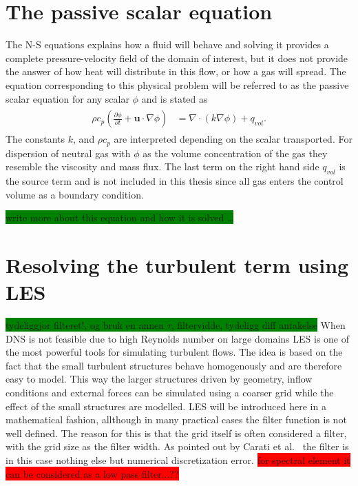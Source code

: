 
\section{The passive scalar equation}
The N-S equations explains how a fluid will behave and solving it provides a complete pressure-velocity field of the 
domain of interest, but it does not provide the answer of how heat will distribute in this flow, or how a gas will spread.
The equation corresponding to this physical problem will be referred to as the passive scalar equation for any scalar 
$\phi$ and is stated as 
\begin{align}
    \begin{split}
        \rho c_p(\frac{\partial \phi}{\partial t} + \mathbf{u}\cdot \nabla\phi) 
        &= \nabla \cdot(k\nabla \phi)+ q_{vol}. 
    \end{split}
	\label{eq:PS}
\end{align}
The constants $k$, and $\rho c_p$ are interpreted depending on 
the scalar transported. For dispersion of neutral gas with $\phi$ as the volume concentration of the gas
they resemble the viscosity and mass flux. The last term on the right hand side $q_{vol}$ is the source term and is not 
included in this thesis since all gas enters the control volume as a boundary condition.

\colorbox{green}{write more about this equation and how it is solved \ldots}

\section{Resolving the turbulent term using LES} \label{LES}
\colorbox{green}{tydeliggjor filteret!, og bruk en annen $\tau$, filtervidde, tydeligg diff antakelse}
When DNS is not feasible due to high Reynolds number on large domains LES is one of the most powerful tools for simulating turbulent flows.
The idea is based on the fact that the small turbulent structures behave homogenously and are therefore easy to model.
This way the larger structures driven by geometry, inflow conditions and external forces can be simulated using a coarser 
grid while the effect of the small structures are modelled. 
LES will be introduced here in a mathematical fashion, allthough in many practical cases the filter function is not 
well defined. The reason for this is that the grid itself is often considered a filter, with the 
grid size as the filter width. As pointed out by Carati et al.~\cite{Carati} the filter is in this case nothing else but 
numerical discretization error. \colorbox{red}{for spectral element it can be considered as a low pass filter...??}

